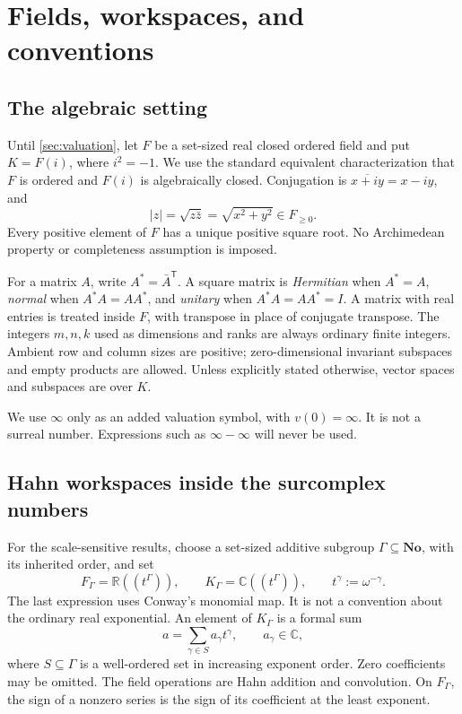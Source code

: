 \documentclass[11pt,a4paper]{article}
\numberwithin{equation}{section}
\theoremstyle{definition}
\theoremstyle{remark}
\newcommand{\No}{\mathbf{No}}
\newcommand{\R}{\mathbb R}
\newcommand{\C}{\mathbb C}
\begin{document}
\section{Fields, workspaces, and conventions}\label{sec:fields}

\subsection{The algebraic setting}
Until \cref{sec:valuation}, let $F$ be a set-sized real closed ordered field
and put $K=F(i)$, where $i^2=-1$. We use the standard equivalent
characterization that $F$ is ordered and $F(i)$ is algebraically closed.
Conjugation is $\overline{x+iy}=x-iy$, and
\[
 |z|=\sqrt{z\bar z}=\sqrt{x^2+y^2}\in F_{\ge0}.
\]
Every positive element of $F$ has a unique positive square root. No
Archimedean property or completeness assumption is imposed.

For a matrix $A$, write $A^*=\bar A^{\mathsf T}$. A square matrix is
\emph{Hermitian} when $A^*=A$, \emph{normal} when $A^*A=AA^*$, and
\emph{unitary} when $A^*A=AA^*=I$. A matrix with real entries is treated
inside $F$, with transpose in place of conjugate transpose. The integers
$m,n,k$ used as dimensions and ranks are always ordinary finite integers.
Ambient row and column sizes are positive; zero-dimensional invariant
subspaces and empty products are allowed.
Unless explicitly stated otherwise, vector spaces and subspaces are over
$K$.

We use $\infty$ only as an added valuation symbol, with
$v(0)=\infty$. It is not a surreal number. Expressions such as
$\infty-\infty$ will never be used.

\subsection{Hahn workspaces inside the surcomplex numbers}
For the scale-sensitive results, choose a set-sized additive
subgroup $\Gamma\subseteq\No$, with its inherited order, and set
\begin{equation}\label{eq:workspace}
 F_\Gamma=\R((t^\Gamma)),\qquad K_\Gamma=\C((t^\Gamma)),
 \qquad t^\gamma:=\omega^{-\gamma}.
\end{equation}
The last expression uses Conway's monomial map. It is not a convention
about the ordinary real exponential. An element of $K_\Gamma$ is a formal
sum
\[
 a=\sum_{\gamma\in S}a_\gamma t^\gamma,
 \qquad a_\gamma\in\C,
\]
where $S\subseteq\Gamma$ is a well-ordered set in increasing exponent
order. Zero coefficients may be omitted. The field operations are Hahn
addition and convolution. On $F_\Gamma$, the sign of a nonzero series is the
sign of its coefficient at the least exponent.
\end{document}
